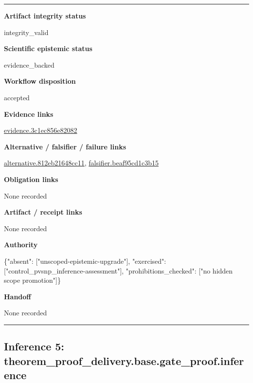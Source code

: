 \documentclass[10pt,a4paper]{article}
\newcommand{\TraceField}[2]{\par\noindent\textbf{#1}\par\noindent #2\par\smallskip}
\newenvironment{TraceDossier}{\par\medskip\noindent\hrule\medskip}{\medskip\hrule\par\medskip}
\begin{document}
\begin{TraceDossier}
\TraceField{Artifact integrity status}{integrity\_\allowbreak{}valid}

\TraceField{Scientific epistemic status}{evidence\_\allowbreak{}backed}

\TraceField{Workflow disposition}{accepted}

\TraceField{Evidence links}{\hyperlink{trace-evidence-c7b6d347be7566237d}{evidence.\allowbreak{}3c1ec856e8\allowbreak{}2082}}

\TraceField{Alternative / falsifier / failure links}{\hyperlink{trace-alternative-45e74495b19bd9955c}{alternativ\allowbreak{}e.\allowbreak{}812eb21648\allowbreak{}cc11}, \hyperlink{trace-alternative-cb9148f3e315a02801}{falsifier.\allowbreak{}beaf95cd1c\allowbreak{}3b15}}

\TraceField{Obligation links}{None recorded}

\TraceField{Artifact / receipt links}{None recorded}

\TraceField{Authority}{\{"absent":\allowbreak{} ["unscoped\allowbreak{}-\allowbreak{}epistemic-\allowbreak{}upgrade"],\allowbreak{} "exercised\allowbreak{}":\allowbreak{} ["control\_\allowbreak{}pvsnp\_\allowbreak{}inference-\allowbreak{}assessment\allowbreak{}"], "prohibiti\allowbreak{}ons\_\allowbreak{}checked":\allowbreak{} ["no hidden scope promotion"\allowbreak{}]\}}

\TraceField{Handoff}{None recorded}

\end{TraceDossier}
\pagebreak[2]\subsection{Inference 5: theorem\_\allowbreak{}proof\_\allowbreak{}delivery.\allowbreak{}base.\allowbreak{}gate\_\allowbreak{}proof.\allowbreak{}inference}\label{trace-inference-75cf170eb1a7d5c562}
\end{document}

